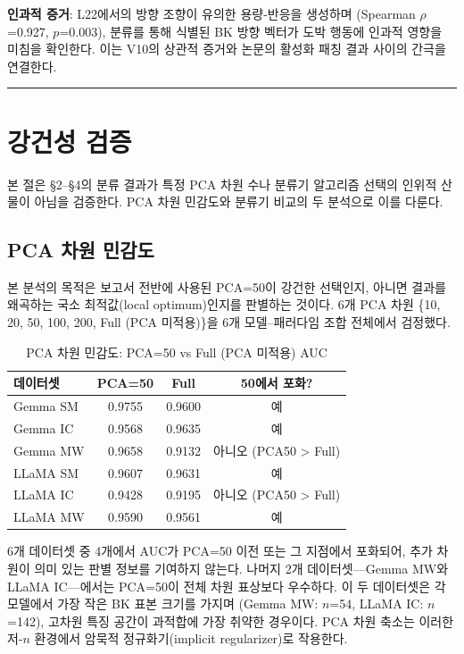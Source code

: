 \documentclass[11pt,a4paper]{article}
\begin{document}
\textbf{인과적 증거}: L22에서의 방향 조향이 유의한 용량-반응을 생성하며 (Spearman $\rho$=0.927, $p$=0.003), 분류를 통해 식별된 BK 방향 벡터가 도박 행동에 인과적 영향을 미침을 확인한다. 이는 V10의 상관적 증거와 논문의 활성화 패칭 결과 사이의 간극을 연결한다.

\bigskip\hrule\bigskip

\section{강건성 검증}\label{sec:robustness_ko}

본 절은 \S2--\S4의 분류 결과가 특정 PCA 차원 수나 분류기 알고리즘 선택의 인위적 산물이 아님을 검증한다. PCA 차원 민감도와 분류기 비교의 두 분석으로 이를 다룬다.

\subsection{PCA 차원 민감도}

본 분석의 목적은 보고서 전반에 사용된 PCA=50이 강건한 선택인지, 아니면 결과를 왜곡하는 국소 최적값(local optimum)인지를 판별하는 것이다. 6개 PCA 차원 \{10, 20, 50, 100, 200, Full (PCA 미적용)\}을 6개 모델--패러다임 조합 전체에서 검정했다.

\begin{table}[H]
\centering
\caption{PCA 차원 민감도: PCA=50 vs Full (PCA 미적용) AUC}
\begin{tabular}{lccc}
\toprule
\textbf{데이터셋} & \textbf{PCA=50} & \textbf{Full} & \textbf{50에서 포화?} \\
\midrule
Gemma SM & 0.9755 & 0.9600 & 예 \\
Gemma IC & 0.9568 & 0.9635 & 예 \\
Gemma MW & 0.9658 & 0.9132 & 아니오 (PCA50 > Full) \\
LLaMA SM & 0.9607 & 0.9631 & 예 \\
LLaMA IC & 0.9428 & 0.9195 & 아니오 (PCA50 > Full) \\
LLaMA MW & 0.9590 & 0.9561 & 예 \\
\bottomrule
\end{tabular}
\end{table}

6개 데이터셋 중 4개에서 AUC가 PCA=50 이전 또는 그 지점에서 포화되어, 추가 차원이 의미 있는 판별 정보를 기여하지 않는다. 나머지 2개 데이터셋---Gemma MW와 LLaMA IC---에서는 PCA=50이 전체 차원 표상보다 우수하다. 이 두 데이터셋은 각 모델에서 가장 작은 BK 표본 크기를 가지며 (Gemma MW: $n$=54, LLaMA IC: $n$=142), 고차원 특징 공간이 과적합에 가장 취약한 경우이다. PCA 차원 축소는 이러한 저-$n$ 환경에서 암묵적 정규화기(implicit regularizer)로 작용한다.
\end{document}
